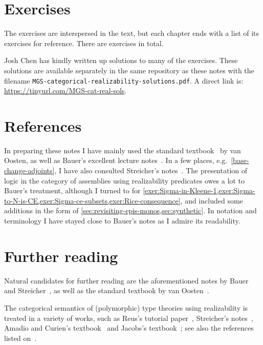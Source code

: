\section{Exercises}

The exercises are interspersed in the text, but each chapter ends with a list of
its exercises for reference.
%
There are  exercises in total.

Josh Chen has kindly written up solutions to many of the exercises. These
solutions are available separately in the same repository as these notes with
the filename \verb|MGS-categorical-realizability-solutions.pdf|. A direct link
is:
\url{https://tinyurl.com/MGS-cat-real-sols}.

\section{References}

In preparing these notes I have mainly used the standard
textbook~\cite{vanOosten2008} by van Oosten, as well as Bauer's excellent
lecture notes~\cite{Bauer2023}.
%
In a few places, e.g.\ \cref{base-change-adjoints}, I have also consulted
Streicher's notes~\cite{Streicher2018}.
%
The presentation of logic in the category of assemblies using realizability
predicates owes a lot to Bauer's treatment, although I turned to
\cite[Section~3.2.7]{vanOosten2008} for
\cref{exer:Sigma-in-Kleene-1,exer:Sigma-to-N-is-CE,exer:Sigma-ce-subsets,exer:Rice-consequence},
and included some additions in the form of
\cref{sec:revisiting-epis-monos,sec:synthetic}.
%
In notation and terminology I have stayed close to Bauer's notes as I admire its
readability.

\section{Further reading}\label{sec:further-reading}

Natural candidates for further reading are the aforementioned
notes by Bauer~\cite{Bauer2023} and Streicher~\cite{Streicher2018}, as well as
the standard textbook by van Oosten~\cite{vanOosten2008}.

The categorical semantics of (polymorphic) type theories using realizability is
treated in a variety of works, such as Reus's tutorial paper~\cite{Reus1999},
Streicher's notes~\cite{Streicher2018}, Amadio and Curien's
textbook~\cite{AmadioCurien1998} and Jacobs's textbook~\cite{Jacobs1999}; see
also the references listed on~\cite[p.~193]{vanOosten2008}.

